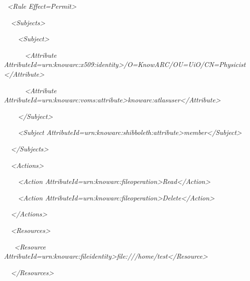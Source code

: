 \documentclass{article}
\begin{document}
{\itshape\color{black}
\ {\textless}Rule
Effect={\textquotedbl}Permit{\textquotedbl}{\textgreater}}

{\itshape\color{black}
\ \ {\textless}Subjects{\textgreater}}

{\itshape\color{black}
\ \ \ \ {\textless}Subject{\textgreater}}

{\itshape\color{black}
\ \ \ \ \ \ {\textless}Attribute
AttributeId={\textquotedbl}urn:knowarc:x509:identity{\textquotedbl}{\textgreater}/O=KnowARC/OU=UiO/CN=Physicist{\textless}/Attribute{\textgreater}}

{\itshape\color{black}
\ \ \ \ \ \ {\textless}Attribute
AttributeId={\textquotedbl}urn:knowarc:voms:attribute{\textgreater}knowarc:atlasuser{\textless}/Attribute{\textgreater}}

{\itshape\color{black}
\ \ \ \ {\textless}/Subject{\textgreater}}

{\itshape\color{black}
\ \ \ \ {\textless}Subject
AttributeId={\textquotedbl}urn:knowarc:shibboleth:attribute{\textquotedbl}{\textgreater}member{\textless}/Subject{\textgreater}}

{\itshape\color{black}
\ \ {\textless}/Subjects{\textgreater}}

{\itshape\color{black}
\ \ {\textless}Actions{\textgreater}}

{\itshape\color{black}
\ \ \ \ {\textless}Action
AttributeId={\textquotedbl}urn:knowarc:fileoperation{\textquotedbl}{\textgreater}Read{\textless}/Action{\textgreater}}

{\itshape\color{black}
\ \ \ \ {\textless}Action
AttributeId={\textquotedbl}urn:knowarc:fileoperation{\textquotedbl}{\textgreater}Delete{\textless}/Action{\textgreater}
\ \ }

{\itshape\color{black}
\ \ {\textless}/Actions{\textgreater}}

{\itshape\color{black}
\ \ {\textless}Resources{\textgreater}}

{\itshape\color{black}
\ \ \ {\textless}Resource
AttributeId={\textquotedbl}urn:knowarc:fileidentity{\textquotedbl}{\textgreater}file:///home/test{\textless}/Resource{\textgreater}}

{\itshape\color{black}
\ \ {\textless}/Resources{\textgreater}}
\end{document}
